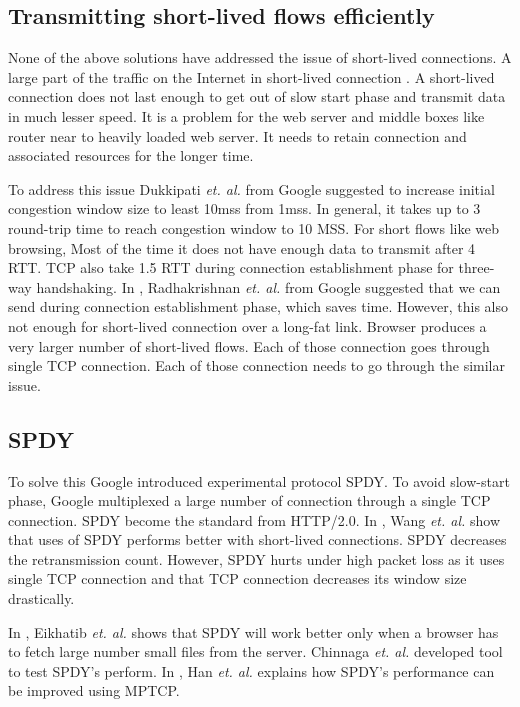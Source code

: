\subsection{Transmitting short-lived flows efficiently}

None of the above solutions have addressed the issue of short-lived connections. A large part of the traffic on the Internet in short-lived connection \cite{kheirkhah2015short}. A short-lived connection does not last enough to get out of slow start phase and transmit data in much lesser speed. It is a problem for the web server and middle boxes like router near to heavily loaded web server. It needs to retain connection and associated resources for the longer time. 

To address this issue Dukkipati \textit{et. al.} from Google suggested to increase initial congestion window size to least 10mss\cite{google-long-initcwnd} from 1mss. In general, it takes up to 3 round-trip time to reach congestion window to 10 MSS. For short flows like web browsing, Most of the time it does not have enough data to transmit after 4 RTT. TCP also take 1.5 RTT during connection establishment phase for three-way handshaking. In \cite{google-fast-open}, Radhakrishnan \textit{et. al.} from Google suggested that we can send during connection establishment phase, which saves time. However, this also not enough for short-lived connection over a long-fat link. Browser produces a very larger number of short-lived flows. Each of those connection goes through single TCP connection. Each of those connection needs to go through the similar issue. 

\subsection{SPDY}
To solve this Google introduced experimental protocol SPDY\cite{spdy}. To avoid slow-start phase, Google multiplexed a large number of connection through a single TCP connection. SPDY become the standard from HTTP/2.0. In \cite{howspeedis}, Wang \textit{et. al.} show that uses of SPDY performs better with short-lived connections. SPDY decreases the retransmission count. However, SPDY hurts under high packet loss as it uses single TCP connection and that TCP connection decreases its window size drastically. 

In \cite{canspdymake}, Eikhatib \textit{et. al.} shows that SPDY will work better only when a browser has to fetch large number small files from the server. Chinnaga \textit{et. al.} developed tool to test SPDY's perform\cite{scalabilitySPDY}. In \cite{han2015anatomy}, Han \textit{et. al.} explains how SPDY's performance can be improved using MPTCP.

